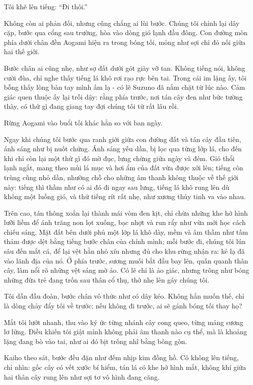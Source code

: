 \documentclass[../main.tex]{subfiles}
\begin{document}
Tôi khẽ lên tiếng: ``Đi thôi.''

Không còn ai phản đối, nhưng cũng chẳng ai lùi bước. Chúng tôi chỉnh lại dây cặp, bước qua cổng sau trường, hòa vào dòng gió lạnh đầu đông. Con đường mòn phía dưới chân đền Aogami hiện ra trong bóng tối, mỏng như sợi chỉ đỏ nối giữa hai thế giới.

Bước chân ai cũng nhẹ, như sợ đất dưới gót giày vỡ tan. Không tiếng nói, không cười đùa, chỉ nghe thấy tiếng lá khô rơi rạo rực bên tai. Trong cái im lặng ấy, tôi bỗng thấy lòng bàn tay mình ấm lạ - có lẽ Suzuno đã nắm chặt từ lúc nào. Cảm giác quen thuộc ấy lại trỗi dậy: rằng phía trước, nơi tán cây đen như bức tường thày, có thứ gì đang giang tay đợi chúng tôi từ rất lâu rồi.

Rừng Aogami vào buổi tối khác hẳn so với ban ngày.

Ngay khi chúng tôi bước qua ranh giới giữa con đường đất và tán cây đầu tiên, ánh sáng như bị nuốt chửng. Ánh sáng yếu dần, bị lọc qua từng lớp lá, cho đến khi chỉ còn lại một thứ gì đó mờ đục, lưng chừng giữa ngày và đêm. Gió thổi lạnh ngắt, mang theo mùi lá mục và hơi ẩm của đất vừa được xới lên; tiếng côn trùng cũng nhỏ dần, nhường chỗ cho những âm thanh không thuộc về thế giới này: tiếng thì thầm như có ai đó đi ngay sau lưng, tiếng lá khô rung lên dù không một luồng gió, và thứ tiếng rít rất nhẹ, như xương thủy tinh va vào nhau.

Trên cao, tán thông xoắn lại thành mái vòm đen kịt, chỉ chừa những khe hở hình lưỡi liềm để ánh trăng non lọt xuống, bạc nhợt và run rẩy như vừa mới học cách chiếu sáng. Mặt đất bên dưới phủ một lớp lá khô dày, mềm và âm thầm như tấm thảm được dệt bằng tiếng bước chân của chính mình; mỗi bước đi, chúng tôi lún sâu đến mắt cá, để lại vệt hằn nhỏ xíu nhưng đủ cho khu rừng nhận ra: kẻ lạ đã vào lãnh địa của nó. Ở phía trước, sương muối bắt đầu bay lên, quấn quanh thân cây, làm nổi rõ những vệt sáng mờ ảo. Có lẽ chỉ là ảo giác, nhưng trông như bóng những đứa trẻ đang trốn sau thân cổ thụ, thở nhẹ lên gáy chúng tôi.

Tôi dẫn đầu đoàn, bước chân vô thức như có dây kéo. Không hẳn muốn thế, chỉ là dòng chảy đẩy tôi về trước; nếu không đi trước, ai sẽ gánh bóng tối thay họ?

Mắt tôi lướt nhanh, thu vào ký ức từng nhánh cây cong queo, từng mảng sương lơ lửng. Điều khiến tôi giật mình không phải âm thanh nào cụ thể, mà là khoảng lặng đang bò vào tai, như ai đó bịt trống nhĩ bằng bông gòn.

Kaiho theo sát, bước đều đặn như đếm nhịp kim đồng hồ. Cô không lên tiếng, chỉ nhìn: gốc cây có vết xước bí hiểm, tán lá có khe hở hình mắt, không khí giữa hai thân cây rung lên như sợi tơ vô hình đang căng.
\end{document}
